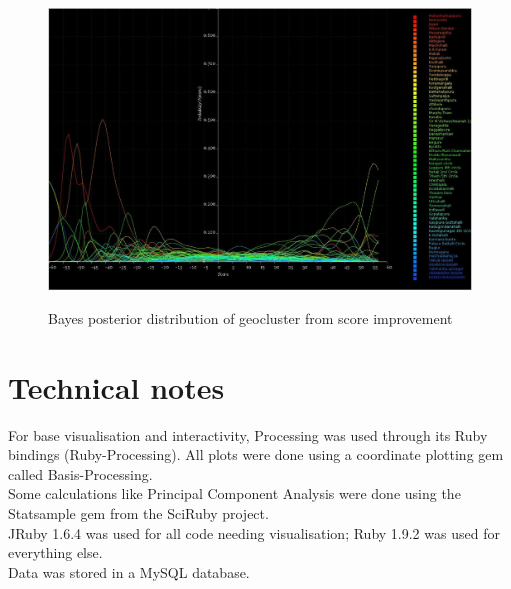 \documentclass[10pt]{article}
\begin{document}
\begin{figure}
\caption{Bayes posterior distribution of geocluster from score improvement}
\label{BayesClusterFromImprovement}
\begin{center}
\includegraphics[width=160mm]{ReportMedia/BayesClusterFromImprovement.jpg}\\
\end{center}
\end{figure}
\newpage
\section{Technical notes}
For base visualisation and interactivity, Processing was used through its Ruby bindings (Ruby-Processing). All plots were done using a coordinate plotting gem called Basis-Processing.\\
Some calculations like Principal Component Analysis were done using the Statsample gem from the SciRuby project.\\
JRuby 1.6.4 was used for all code needing visualisation; Ruby 1.9.2 was used for everything else.\\
Data was stored in a MySQL database.
\end{document}
